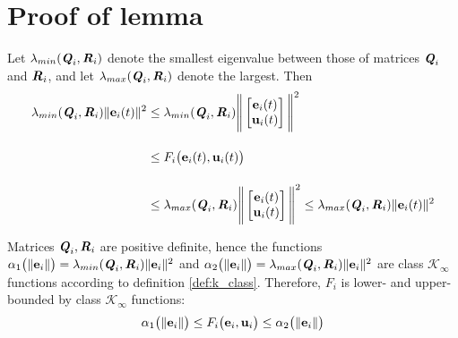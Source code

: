 \section{Proof of lemma }

  Let $\lambda_{min}(\bm{\mathit{Q}}_i, \bm{\mathit{R}}_i)$ denote the smallest eigenvalue
  between those of matrices $\bm{\mathit{Q}}_i$ and $\bm{\mathit{R}}_i$, and let
  $\lambda_{max}(\bm{\mathit{Q}}_i, \bm{\mathit{R}}_i)$ denote the largest. Then
  \begin{align}
    \lambda_{min}(\bm{\mathit{Q}}_i, \bm{\mathit{R}}_i)\|\bm{\mathbf{e}}_i(t)\|^2 &\leq
    \lambda_{min}(\bm{\mathit{Q}}_i, \bm{\mathit{R}}_i) \Bigg\| \begin{bmatrix}
        \bm{\mathbf{e}}_i(t) \\
        \bm{\mathbf{u}}_i(t)
      \end{bmatrix}\Bigg\|^2  \\[2.5ex]
      &\leq F_i \big(\bm{\mathbf{e}}_i(t), \bm{\mathbf{u}}_i(t)\big) \\[2.5ex]
      &\leq \lambda_{max}(\bm{\mathit{Q}}_i, \bm{\mathit{R}}_i) \Bigg\| \begin{bmatrix}
        \bm{\mathbf{e}}_i(t) \\
        \bm{\mathbf{u}}_i(t)
      \end{bmatrix}\Bigg\|^2 \leq
    \lambda_{max}(\bm{\mathit{Q}}_i, \bm{\mathit{R}}_i) \|\bm{\mathbf{e}}_i(t)\|^2
  \end{align}

  Matrices $\bm{\mathit{Q}}_i, \bm{\mathit{R}}_i$ are positive definite, hence the functions
  $\alpha_1 \big(\|\bm{\mathbf{e}}_i\|\big) = \lambda_{min}(\bm{\mathit{Q}}_i, \bm{\mathit{R}}_i) \|\bm{\mathbf{e}}_i\|^2$ and
  $\alpha_2 \big(\|\bm{\mathbf{e}}_i\|\big)= \lambda_{max}(\bm{\mathit{Q}}_i, \bm{\mathit{R}}_i) \|\bm{\mathbf{e}}_i\|^2$ are
  class $\mathcal{K}_{\infty}$ functions according to definition \eqref{def:k_class}.
  Therefore, $F_i$ is lower- and upper-bounded by class $\mathcal{K}_{\infty}$
  functions:
  \begin{align}
    \alpha_1\big(\|\bm{\mathbf{e}}_i\|\big) \leq F_i\big(\bm{\mathbf{e}}_i, \bm{\mathbf{u}}_i\big) \leq \alpha_2\big(\| \bm{\mathbf{e}}_i \|\big)
  \end{align}
